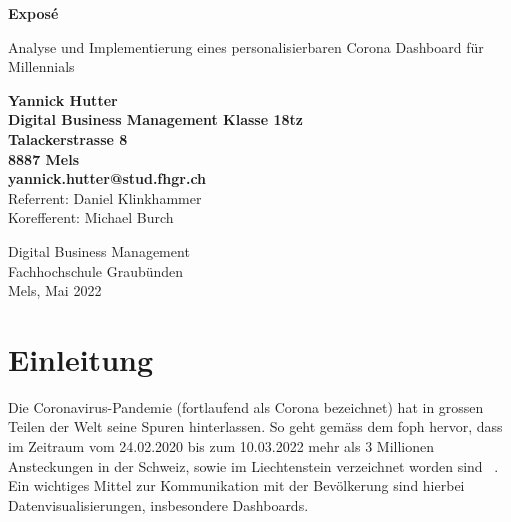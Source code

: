 \documentclass[12pt, oneside]{article}
\begin{document}
\begin{titlepage}
	\begin{center}
		\Huge
		\textbf{Exposé}
		
		\vspace{0.5cm}
		\LARGE
		Analyse und Implementierung eines personalisierbaren Corona Dashboard für Millennials
		
		\vspace{1.5cm}
		\normalsize
		\textbf{Yannick Hutter}\\
		\textbf{Digital Business Management Klasse 18tz}\\
		\textbf{Talackerstrasse 8}\\
		\textbf{8887 Mels}\\
		\textbf{yannick.hutter@stud.fhgr.ch}\\

		
		\vfill
		Referrent: Daniel Klinkhammer\\
		Korefferent: Michael Burch\\
		
		\vspace{0.8cm}
		
		
		Digital Business Management\\
		Fachhochschule Graubünden\\
		Mels, Mai 2022
	\end{center}
\end{titlepage}



\tableofcontents
\listoffigures
\listoftables

\clearpage
\printglossaries



\clearpage
{}
\setcounter{page}{3}

\section{Einleitung}
Die Coronavirus-Pandemie (fortlaufend als Corona bezeichnet) hat in grossen Teilen der Welt seine Spuren hinterlassen. So geht gemäss dem \Gls{foph} hervor, dass im Zeitraum vom 24.02.2020 bis zum 10.03.2022 mehr als 3 Millionen Ansteckungen in der Schweiz, sowie im Liechtenstein verzeichnet worden sind ~\citep{FOPH.13.03.2022}. Ein wichtiges Mittel zur Kommunikation mit der Bevölkerung sind hierbei Datenvisualisierungen, insbesondere Dashboards.\\
\end{document}
